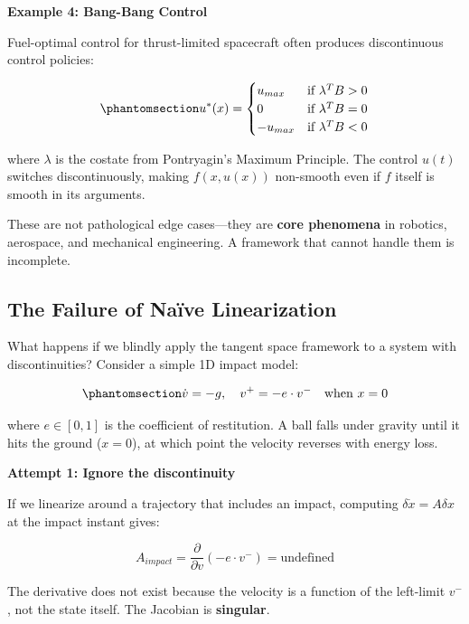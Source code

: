 \documentclass[
  letterpaper,
  DIV=11,
  numbers=noendperiod]{scrartcl}
\begin{document}
\begin{tcolorbox}
\textbf{Example 4: Bang-Bang Control}

Fuel-optimal control for thrust-limited spacecraft often produces
discontinuous control policies:

\begin{equation}\phantomsection\label{eq-bang-bang}{
u^*(x) = \begin{cases}
u_{max} & \text{if } \lambda^T B > 0 \\
0 & \text{if } \lambda^T B = 0 \\
-u_{max} & \text{if } \lambda^T B < 0
\end{cases}
}\end{equation}

where \(\lambda\) is the costate from Pontryagin's Maximum Principle.
The control \(u(t)\) switches discontinuously, making \(f(x, u(x))\)
non-smooth even if \(f\) itself is smooth in its arguments.

\end{tcolorbox}

These are not pathological edge cases---they are \textbf{core phenomena}
in robotics, aerospace, and mechanical engineering. A framework that
cannot handle them is incomplete.

\subsection{The Failure of Naïve
Linearization}\label{the-failure-of-nauxefve-linearization}

What happens if we blindly apply the tangent space framework to a system
with discontinuities? Consider a simple 1D impact model:

\begin{equation}\phantomsection\label{eq-bounce}{
\dot{v} = -g, \quad v^+ = -e \cdot v^- \quad \text{when } x = 0
}\end{equation}

where \(e \in [0,1]\) is the coefficient of restitution. A ball falls
under gravity until it hits the ground (\(x = 0\)), at which point the
velocity reverses with energy loss.

\textbf{Attempt 1: Ignore the discontinuity}

If we linearize around a trajectory that includes an impact, computing
\(\delta\dot{x} = A\delta x\) at the impact instant gives:

\[
A_{impact} = \frac{\partial}{\partial v}\left(-e \cdot v^-\right) = \text{undefined}
\]

The derivative does not exist because the velocity is a function of the
left-limit \(v^-\), not the state itself. The Jacobian is
\textbf{singular}.
\end{document}
